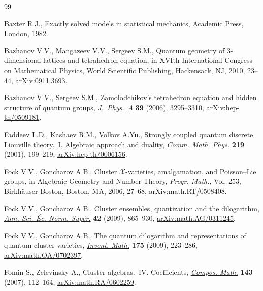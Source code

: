 \documentclass[pdftex]{sigma}
\numberwithin{equation}{section}
\begin{document}
\begin{thebibliography}{99}
\footnotesize\itemsep=0pt

Baxter R.J., Exactly solved models in statistical mechanics, Academic Press,
 London, 1982.

Bazhanov V.V., Mangazeev V.V., Sergeev S.M., Quantum geometry of 3-dimensional
 lattices and tetrahedron equation, in X{VI}th {I}nternational {C}ongress on
 {M}athematical {P}hysics, \href{https://doi.org/10.1142/9789814304634_0001}{World Scientific Publishing}, Hackensack, NJ, 2010,
 23--44, \href{https://arxiv.org/abs/0911.3693}{arXiv:0911.3693}.

Bazhanov V.V., Sergeev S.M., Zamolodchikov's tetrahedron equation and hidden
 structure of quantum groups, \href{https://doi.org/10.1088/0305-4470/39/13/009}{\textit{J.~Phys.~A}} \textbf{39} (2006),
 3295--3310, \href{https://arxiv.org/abs/hep-th/0509181}{arXiv:hep-th/0509181}.

Faddeev L.D., Kashaev R.M., Volkov A.Yu., Strongly coupled quantum discrete
 {L}iouville theory.~{I}. {A}lgebraic approach and duality, \href{https://doi.org/10.1007/s002200100412}{\textit{Comm.
 Math. Phys.}} \textbf{219} (2001), 199--219, \href{https://arxiv.org/abs/hep-th/0006156}{arXiv:hep-th/0006156}.

Fock V.V., Goncharov A.B., Cluster {$\mathcal{X}$}-varieties, amalgamation, and
 {P}oisson--{L}ie groups, in Algebraic {G}eometry and {N}umber {T}heory,
 \textit{Progr. Math.}, Vol. 253, \href{https://doi.org/10.1007/978-0-8176-4532-8_2}{Birkh\"auser Boston}, Boston, MA, 2006,
 27--68, \href{https://arxiv.org/abs/math.RT/0508408}{arXiv:math.RT/0508408}.

Fock V.V., Goncharov A.B., Cluster ensembles, quantization and the dilogarithm,
 \href{https://doi.org/10.24033/asens.2112}{\textit{Ann. Sci. \'Ec. Norm. Sup\'er.}} \textbf{42} (2009), 865--930,
 \href{https://arxiv.org/abs/math.AG/0311245}{arXiv:math.AG/0311245}.

Fock V.V., Goncharov A.B., The quantum dilogarithm and representations of
 quantum cluster varieties, \href{https://doi.org/10.1007/s00222-008-0149-3}{\textit{Invent. Math.}} \textbf{175} (2009),
 223--286, \href{https://arxiv.org/abs/math.QA/0702397}{arXiv:math.QA/0702397}.

Fomin S., Zelevinsky A., Cluster algebras.~{IV}. {C}oefficients,
 \href{https://doi.org/10.1112/S0010437X06002521}{\textit{Compos. Math.}} \textbf{143} (2007), 112--164,
 \href{https://arxiv.org/abs/math.RA/0602259}{arXiv:math.RA/0602259}.


\end{thebibliography}
\end{document}
